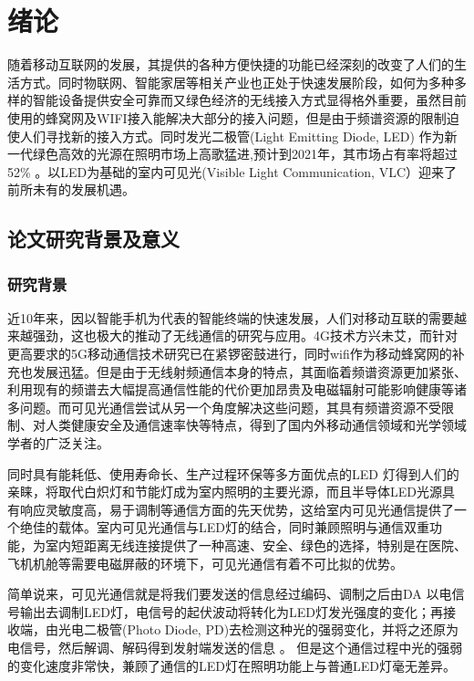 
\chapter{绪论}\label{chap:introduction}
随着移动互联网的发展，其提供的各种方便快捷的功能已经深刻的改变了人们的生活方式。同时物联网、智能家居等相关产业也正处于快速发展阶段，如何为多种多样的智能设备提供安全可靠而又绿色经济的无线接入方式显得格外重要，虽然目前使用的蜂窝网及WIFI接入能解决大部分的接入问题，但是由于频谱资源的限制迫使人们寻找新的接入方式。同时发光二极管(Light Emitting Diode, LED) 作为新一代绿色高效的光源在照明市场上高歌猛进,预计到2021年，其市场占有率将超过52\%
\cite{陈特2013可见光通信的研究}。以LED为基础的室内可见光(Visible Light Communication, VLC）迎来了前所未有的发展机遇。

\section{论文研究背景及意义}\label{sec:background}
\subsection{研究背景}
近10年来，因以智能手机为代表的智能终端的快速发展，人们对移动互联的需要越来越强劲，这也极大的推动了无线通信的研究与应用。4G技术方兴未艾，而针对更高要求的5G移动通信技术研究已在紧锣密鼓进行，同时wifi作为移动蜂窝网的补充也发展迅猛。但是由于无线射频通信本身的特点，其面临着频谱资源更加紧张、利用现有的频谱去大幅提高通信性能的代价更加昂贵及电磁辐射可能影响健康等诸多问题。而可见光通信尝试从另一个角度解决这些问题，其具有频谱资源不受限制、对人类健康安全及通信速率快等特点，得到了国内外移动通信领域和光学领域学者的广泛关注。

同时具有能耗低、使用寿命长、生产过程环保等多方面优点的LED 灯得到人们的亲睐，将取代白炽灯和节能灯成为室内照明的主要光源，而且半导体LED光源具有响应灵敏度高，易于调制等通信方面的先天优势，这给室内可见光通信提供了一个绝佳的载体。室内可见光通信与LED灯的结合，同时兼顾照明与通信双重功能，为室内短距离无线连接提供了一种高速、安全、绿色的选择，特别是在医院、飞机机舱等需要电磁屏蔽的环境下，可见光通信有着不可比拟的优势。

简单说来，可见光通信就是将我们要发送的信息经过编码、调制之后由DA 以电信号输出去调制LED灯，电信号的起伏波动将转化为LED灯发光强度的变化；再接收端，由光电二极管(Photo Diode, PD)去检测这种光的强弱变化，并将之还原为电信号，然后解调、解码得到发射端发送的信息
\cite{tanaka2001indoor,fan2002effect,komine2003integrated,komine2004fundamental}。 但是这个通信过程中光的强弱的变化速度非常快，兼顾了通信的LED灯在照明功能上与普通LED灯毫无差异。


